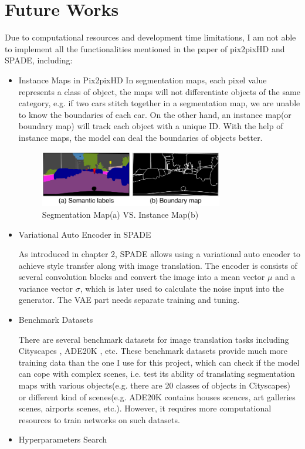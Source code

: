 \section{Future Works}
Due to computational resources and development time limitations, I am not able 
to implement all the functionalities mentioned in the paper of pix2pixHD\cite{wang2018pix2pixHD}
and SPADE\cite{park2019SPADE}, including:
\begin{itemize}
    \item Instance Maps in Pix2pixHD
    In segmentation maps, each pixel value represents a class of object, the maps will not 
    differentiate objects of the same category, e.g. if two cars stitch together in a 
    segmentation map, we are unable to know the boundaries of each car. On the other hand, 
    an instance map(or boundary map) will track each object with a unique ID. With the help 
    of instance maps, the model can deal the boundaries of objects better.
    \begin{figure}[H]
        \begin{center}
        \includegraphics[width=8cm]{figures/instance-map}
        \end{center}
        \caption{Segmentation Map(a) VS. Instance Map(b)}
        \label{fig:instance-map}
    \end{figure}
    \item Variational Auto Encoder in SPADE
    
    As introduced in chapter 2, SPADE allows using a variational auto encoder to achieve 
    style transfer along with image translation. The encoder is consists of several 
    convolution blocks and convert the image into a mean vector $\mu$ and a variance vector
    $\sigma$, which is later used to calculate the noise input into the generator. 
    The VAE part needs separate training and tuning.
    \item Benchmark Datasets
    
    \nocite{zhou2016semantic}
    There are several benchmark datasets for image translation tasks including 
    Cityscapes \cite{Cordts2016Cityscapes}, ADE20K \cite{zhou2017scene}, etc. These 
    benchmark datasets provide much more training data than the one I use for this 
    project, which can check if the model can cope with complex scenes, i.e. test its ability of 
    translating segmentation maps with various objects(e.g. there are 20 classes of objects in Cityscapes) 
    or different kind of scenes(e.g. ADE20K contains houses scences, art galleries scenes, airports 
    scenes, etc.). 
    However, it requires more computational resources to train networks on such 
    datasets.
    \item Hyperparameters Search
    

\end{itemize}
